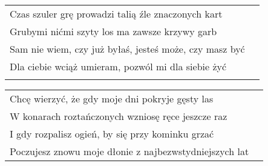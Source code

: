 \documentclass[a5paper]{article}
\begin{document}
\noindent
\begin{tabular}{@{}p{8.80cm}p{3cm}@{}}
Czas szuler grę prowadzi talią źle znaczonych kart \\
Grubymi nićmi szyty los ma zawsze krzywy garb \\
Sam nie wiem, czy już byłaś, jesteś może, czy masz być\\
Dla ciebie wciąż umieram, pozwól mi dla siebie żyć \\ \\
\end{tabular}

\noindent
\begin{tabular}{@{}p{8.80cm}p{3cm}@{}}
Chcę wierzyć, że gdy moje dni pokryje gęsty las\\
W konarach roztańczonych wzniosę ręce jeszcze raz\\
I gdy rozpalisz ogień, by się przy kominku grzać\\
Poczujesz znowu moje dłonie z najbezwstydniejszych lat
\end{tabular}
\end{document}
